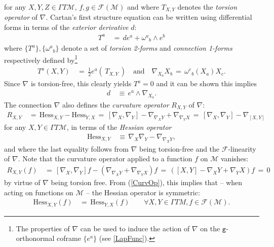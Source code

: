 \documentclass[10pt,a4paper]{article}
\newcommand{\M}{\mathcal{M}}
\newcommand{\g}{\texttt{g}}
\newcommand\w{\wedge}
\newcommand\QUAD[1]{\quad\text{#1}\quad}
\newcommand{\FM}{\mathcal{F}(\M)}
\newcommand{\Hess}{\text{Hess}}
\begin{document}
for any $X,Y,Z\in\Gamma T\M$, $f,g\in\FM$ and where $T_{X,Y}$ denotes the {\it torsion operator} of $\nabla$. Cartan's first structure equation can be written using differential forms in terms of the {\it exterior derivative} $d$:
\begin{align*}
	T^{a} &\,=\, de^{a} + \omega^{a}{}_{b}\w e^{b}
\end{align*}
where $\{T^{a}\}, \{\omega^{a}{}_{b}\}$ denote a set of {\it torsion 2-forms} and {\it connection 1-forms} respectively defined by\footnote{The properties of $\nabla$ can be used to induce the action of $\nabla$ on the $\g$-orthonormal coframe $\{e^{a}\}$ (see \ref{LapFunc}).}
\begin{align*}
	T^{a}(X,Y) &\,=\, \frac{1}{2}e^{a}(\,T_{X,Y}\,) \QUAD{and} \nabla_{X_{a}}X_{b} \,=\, \omega^{c}_{\;\;b}(X_{a})X_{c}.
\end{align*}
Since $\nabla$ is torsion-free, this clearly yields $T^{a}=0$ and it can be shown this implies \cite{BennTucker}
\begin{align}\label{d2nabla}
	d &\,\equiv\, e^{a} \w \nabla_{X_{a}}.
\end{align}
The connection $\nabla$ also defines the {\it curvature operator} $R_{X,Y}$ of $\nabla$:
\begin{align}\label{CurvOp}
	R_{X,Y} &\,=\, \Hess_{X,Y} - \Hess_{Y,X} \,=\, [\nabla_{X},\nabla_{Y}] - \nabla_{\nabla_{X}Y} + \nabla_{\nabla_{Y}X} \,=\, [\nabla_{X},\nabla_{Y}] - \nabla_{[X,Y]} 
\end{align}
for any $X,Y\in\Gamma T\M$, in terms of the {\it Hessian operator}
\begin{align*}
	\Hess_{X,Y} &\,\equiv\, \nabla_{X}\nabla_{Y} - \nabla_{\nabla_{X}Y},
\end{align*}
and where the last equality follows from $\nabla$ being torsion-free and the $\mathcal{F}$-linearity of $\nabla$. Note that the curvature operator applied to a function $f$ on $\M$ vanishes:
\begin{align*}
	R_{X,Y}(f) &\,=\, [\nabla_{X},\nabla_{Y}]f - \left(\nabla_{\nabla_{X}Y} + \nabla_{\nabla_{Y}X}\right)f \,=\, \left([X,Y] - \nabla_{X}Y + \nabla_{Y}X\right)f \,=\,0
\end{align*}
by virtue of $\nabla$ being torsion free. From (\ref{CurvOp}), this implies that -- when acting on functions on $\M$ -- the Hessian operator is symmetric:
\begin{align}\label{SymHess}
	\Hess_{X,Y}(f) &\,=\, \Hess_{Y,X}(f) \qquad\forall X,Y \in \Gamma TM, f\in\FM.
\end{align}
\end{document}
